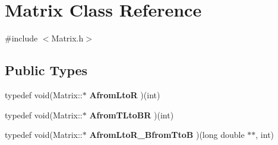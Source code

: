 \hypertarget{classMatrix}{\section{Matrix Class Reference}
\label{classMatrix}
}


{\ttfamily \#include $<$Matrix.\-h$>$}

\subsection*{Public Types}
\begin{DoxyCompactItemize}
\item 
\hypertarget{classMatrix_ab7fb1c1d8791c91df4459813a4516553}{typedef void(Matrix\-::$\ast$ {\bfseries Afrom\-Lto\-R} )(int)}\label{classMatrix_ab7fb1c1d8791c91df4459813a4516553}

\item 
\hypertarget{classMatrix_ac009935efb8de5a8680f125c93fabbc3}{typedef void(Matrix\-::$\ast$ {\bfseries Afrom\-T\-Lto\-B\-R} )(int)}\label{classMatrix_ac009935efb8de5a8680f125c93fabbc3}

\item 
\hypertarget{classMatrix_ab5791ce1add5bb8f0d28babb85fee6d7}{typedef void(Matrix\-::$\ast$ {\bfseries Afrom\-Lto\-R\-\_\-\-Bfrom\-Tto\-B} )(long double $\ast$$\ast$, int)}\label{classMatrix_ab5791ce1add5bb8f0d28babb85fee6d7}

\end{DoxyCompactItemize}
